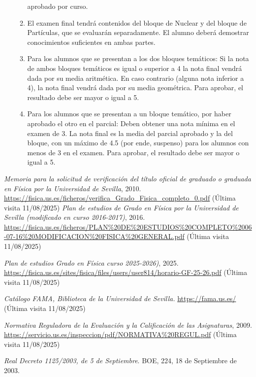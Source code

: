 \documentclass[a4paper,12pt,twoside]{article}
\begin{document}
\begin{itemize}
\begin{enumerate}[label=\alph*)]
aprobado por curso.
\item El examen final tendrá contenidos del bloque de Nuclear y del bloque de Partículas, que se
evaluarán separadamente. El alumno deberá demostrar conocimientos suficientes en ambas
partes.
\item Para los alumnos que se presentan a los dos bloques temáticos: Si la nota de ambos bloques
temáticos es igual o superior a 4 la nota final vendrá dada por su media aritmética. En caso
contrario (alguna nota inferior a 4), la nota final vendrá dada por su media geométrica. Para
aprobar, el resultado debe ser mayor o igual a 5.
\item Para los alumnos que se presentan a un bloque temático, por haber aprobado el otro en el parcial: Deben obtener una nota mínima en el examen de 3. La nota final es la media del parcial aprobado y la del bloque, con un máximo de 4.5 (por ende, suspenso) para los alumnos con menos de 3 en el examen. Para aprobar, el resultado debe ser mayor o igual a 5. 
\end{enumerate}
\end{itemize}

\begin{thebibliography}{99}
\textit{Memoria para la solicitud de verificación del título oficial de graduado o graduada en Física por la Universidad de Sevilla}, 2010. \url{https://fisica.us.es/ficheros/verifica_Grado_Fisica_completo_0.pdf} (Última visita 11/08/2025)
\textit{Plan de estudios de Grado en Física por la Universidad de Sevilla (modificado en curso 2016-2017)}, 2016. \url{https://fisica.us.es/ficheros/PLAN\%20DE\%20ESTUDIOS\%20COMPLETO\%2006-07-16\%20MODIFICACION\%20FISICA\%20GENERAL.pdf} (Última visita 11/08/2025)

\textit{Plan de estudios Grado en Física curso 2025-2026)}, 2025.
\url{https://fisica.us.es/sites/fisica/files/users/user814/horario-GF-25-26.pdf} (Última visita 11/08/2025)

\textit{Catálogo FAMA, Biblioteca de la Universidad de Sevilla.} \url{https://fama.us.es/} (Última visita 11/08/2025)

\textit{Normativa Reguladora de la Evaluación y la Calificación de las Asignaturas}, 2009. \url{https://servicio.us.es/inspeccion/pdf/NORMATIVA\%20REGUL.pdf} (Última visita 11/08/2025)

 \textit{Real Decreto 1125/2003, de 5 de Septiembre}. BOE, 224, 18 de Septiembre de 2003.

\end{thebibliography}
\end{document}
